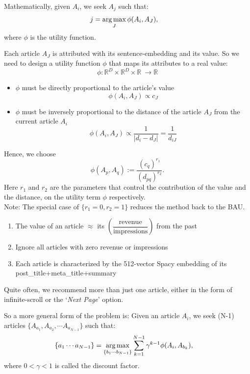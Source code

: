 \documentclass[11]{article}
\begin{document}
Mathematically, given $A_i$, we seek $A_j$ such that:
\begin{align*}
 j&= \operatorname*{arg\,max}_J   \phi(A_i, A_{J}) ,
\end{align*}
where $\phi$ is the utility function.


Each article $A_J$ is attributed with its sentence-embedding and its value. So we need to design a utility function $\phi$ that maps its attributes to a real value:
\[ \phi: \mathbb{R}^D\times\mathbb{R}^D\times\mathbb{R}\ \to \mathbb{R} \]

\begin{itemize}
\item $\phi$ must be directly proportional to the  article's value \[ \phi(A_i, A_{J})  \propto c_J \]
\item $\phi$ must be inversely proportional to the  distance of the article $A_J$ from the current article $A_i$ \[ \phi(A_i, A_{J})  \propto \frac{1}{|d_i-d_J|} =\frac{1}{d_{iJ}} \]
\end{itemize}

Hence, we choose $$\phi(A_p, A_{q}):=\dfrac{(c_{q})^{r_1}}{(d_{pq})^{r_2}}.$$ Here $r_1$ and $r_2$ are the parameters that control the contribution of the value and the distance, on the utility term $\phi$ respectively. \\Note: The special case of $\{r_1=0, r_2=1 \}$ reduces the method back to the BAU.

\begin{enumerate}
\item The value of an article $\approx$ its $\left(\dfrac{\text{revenue}}{\text{impressions}} \right)$  from the past
\item Ignore all articles with zero revenue or impressions
\item Each article is characterized by the 512-vector Spacy embedding of its post\_title+meta\_title+summary
\end{enumerate}


 Quite often, we recommend more than just one article, either in the form of infinite-scroll or the `\textit{Next Page}' option.

So a more general form of the problem is:
Given an article $A_i$, we seek (N-1) articles $\{A_{a_1}, A_{a_2}, \cdots A_{a_{N-1}}\}$ such that:
\begin{align*}
\{a_1 \cdots a_{N-1}\} &= \operatorname*{arg\,max}_{\{b_1\cdots b_{{N-1}}\}}  \sum_{k=1}^{N-1}  \gamma^{k-1} \phi(A_i, A_{b_k}),
\end{align*}
where $0<\gamma<1$ is called the discount factor.
\end{document}

